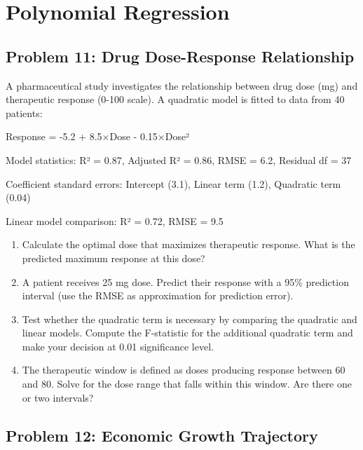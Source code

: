 \documentclass[12pt]{article}
\begin{document}

\section{Polynomial Regression}

\subsection*{Problem 11: Drug Dose-Response Relationship}

A pharmaceutical study investigates the relationship between drug dose (mg) and therapeutic response (0-100 scale). A quadratic model is fitted to data from 40 patients:

Response = -5.2 + 8.5×Dose - 0.15×Dose²

Model statistics: R² = 0.87, Adjusted R² = 0.86, RMSE = 6.2, Residual df = 37

Coefficient standard errors: Intercept (3.1), Linear term (1.2), Quadratic term (0.04)

Linear model comparison: R² = 0.72, RMSE = 9.5

\begin{enumerate}[label=(\alph*)]
\item Calculate the optimal dose that maximizes therapeutic response. What is the predicted maximum response at this dose?

\item A patient receives 25 mg dose. Predict their response with a 95\% prediction interval (use the RMSE as approximation for prediction error).

\item Test whether the quadratic term is necessary by comparing the quadratic and linear models. Compute the F-statistic for the additional quadratic term and make your decision at 0.01 significance level.

\item The therapeutic window is defined as doses producing response between 60 and 80. Solve for the dose range that falls within this window. Are there one or two intervals?
\end{enumerate}

\subsection*{Problem 12: Economic Growth Trajectory}
\end{document}
